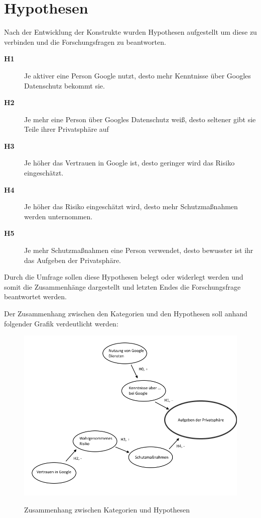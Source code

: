 \section{Hypothesen}
Nach der Entwicklung der Konstrukte wurden Hypothesen aufgestellt um diese zu verbinden und die Forschungsfragen zu beantworten.
\begin{description}
\item[\label{itm:H0}\textbf{H1}]Je aktiver eine Person Google nutzt, desto mehr Kenntnisse über Googles Datenschutz bekommt sie.
\item[\label{itm:H1}\textbf{H2}]Je mehr eine Person über Googles Datenschutz weiß, desto seltener gibt sie Teile ihrer Privatsphäre auf
\item[\label{itm:H2}\textbf{H3}]Je höher das Vertrauen in Google ist, desto geringer wird das Risiko eingeschätzt.
\item[\label{itm:H3}\textbf{H4}]Je höher das Risiko eingeschätzt wird, desto mehr Schutzmaßnahmen werden unternommen.
\item[\label{itm:H4}\textbf{H5}]Je mehr Schutzmaßnahmen eine Person verwendet, desto bewusster ist ihr das Aufgeben der Privatsphäre.
\end{description}

Durch die Umfrage sollen diese Hypothesen belegt oder widerlegt werden und somit die Zusammenhänge dargestellt und letzten Endes die Forschungsfrage beantwortet werden.

Der Zusammenhang zwischen den Kategorien und den Hypothesen soll anhand folgender Grafik verdeutlicht werden:
\begin{figure}[H]
\centering
\includegraphics[scale=0.55]{images/bubbles}\\
\caption{Zusammenhang zwischen Kategorien und Hypothesen}\label{bubbles}
\end{figure}

